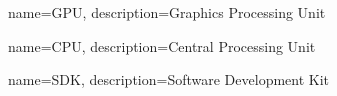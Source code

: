 {
  name={GPU},
  description={{Graphics Processing Unit}}
}

{
  name={CPU},
  description={{Central Processing Unit}}
}

{
  name={SDK},
  description={{Software Development Kit}}
}
